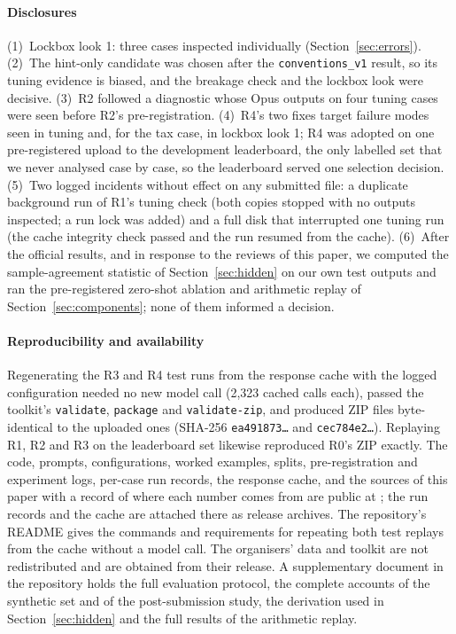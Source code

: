 \documentclass[conference]{IEEEtran}
\newcommand{\id}[1]{\texttt{#1}}
\begin{document}
\paragraph*{Disclosures}
(1)~Lockbox look 1: three cases inspected individually (Section~\ref{sec:errors}). (2)~The hint-only candidate was chosen after the \id{conventions\_v1} result, so its tuning evidence is biased, and the breakage check and the lockbox look were decisive. (3)~R2 followed a diagnostic whose Opus outputs on four tuning cases were seen before R2's pre-registration. (4)~R4's two fixes target failure modes seen in tuning and, for the tax case, in lockbox look 1; R4 was adopted on one pre-registered upload to the development leaderboard, the only labelled set that we never analysed case by case, so the leaderboard served one selection decision. (5)~Two logged incidents without effect on any submitted file: a duplicate background run of R1's tuning check (both copies stopped with no outputs inspected; a run lock was added) and a full disk that interrupted one tuning run (the cache integrity check passed and the run resumed from the cache). (6)~After the official results, and in response to the reviews of this paper, we computed the sample-agreement statistic of Section~\ref{sec:hidden} on our own test outputs and ran the pre-registered zero-shot ablation and arithmetic replay of Section~\ref{sec:components}; none of them informed a decision.

\paragraph*{Reproducibility and availability}
Regenerating the R3 and R4 test runs from the response cache with the logged configuration needed no new model call (2,323 cached calls each), passed the toolkit's \id{validate}, \id{package} and \id{validate-zip}, and produced ZIP files byte-identical to the uploaded ones (SHA-256 \id{ea491873\ldots} and \id{cec784e2\ldots}). Replaying R1, R2 and R3 on the leaderboard set likewise reproduced R0's ZIP exactly. The code, prompts, configurations, worked examples, splits, pre-registration and experiment logs, per-case run records, the response cache, and the sources of this paper with a record of where each number comes from are public at \repourl; the run records and the cache are attached there as release archives. The repository's README gives the commands and requirements for repeating both test replays from the cache without a model call. The organisers' data and toolkit are not redistributed and are obtained from their release. A supplementary document in the repository holds the full evaluation protocol, the complete accounts of the synthetic set and of the post-submission study, the derivation used in Section~\ref{sec:hidden} and the full results of the arithmetic replay.
\end{document}
